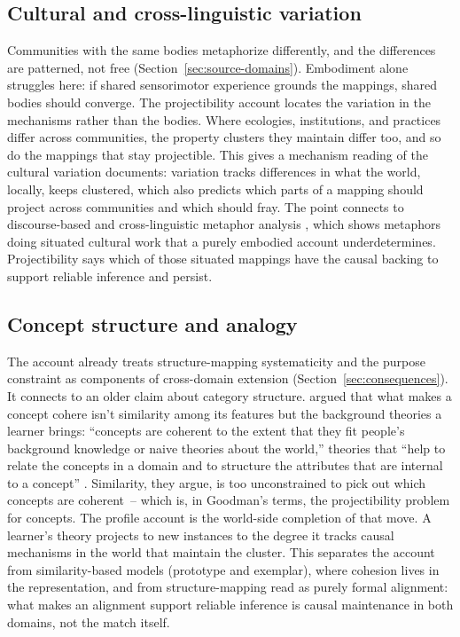 \documentclass[12pt]{article}
\begin{document}
\subsection{Cultural and cross-linguistic variation}

Communities with the same bodies metaphorize differently, and the differences are patterned, not free (Section~\ref{sec:source-domains}). Embodiment alone struggles here: if shared sensorimotor experience grounds the mappings, shared bodies should converge. The projectibility account locates the variation in the mechanisms rather than the bodies. Where ecologies, institutions, and practices differ across communities, the property clusters they maintain differ too, and so do the mappings that stay projectible. This gives a mechanism reading of the cultural variation \textcite{kovecses2005} documents: variation tracks differences in what the world, locally, keeps clustered, which also predicts which parts of a mapping should project across communities and which should fray. The point connects to discourse-based and cross-linguistic metaphor analysis \citep[e.g.][]{semino2008, musolff2006}, which shows metaphors doing situated cultural work that a purely embodied account underdetermines. Projectibility says which of those situated mappings have the causal backing to support reliable inference and persist.

\subsection{Concept structure and analogy}

The account already treats structure-mapping systematicity \citep{gentner1983} and the purpose constraint \citep{holyoak2018} as components of cross-domain extension (Section~\ref{sec:consequences}). It connects to an older claim about category structure. \textcite{murphymedin1985} argued that what makes a concept cohere isn't similarity among its features but the background theories a learner brings: \enquote{concepts are coherent to the extent that they fit people's background knowledge or naive theories about the world,} theories that \enquote{help to relate the concepts in a domain and to structure the attributes that are internal to a concept} \citep[289]{murphymedin1985}. Similarity, they argue, is too unconstrained to pick out which concepts are coherent~-- which is, in Goodman's terms, the projectibility problem for concepts. The profile account is the world-side completion of that move. A learner's theory projects to new instances to the degree it tracks causal mechanisms in the world that maintain the cluster. This separates the account from similarity-based models (prototype and exemplar), where cohesion lives in the representation, and from structure-mapping read as purely formal alignment: what makes an alignment support reliable inference is causal maintenance in both domains, not the match itself.
\end{document}

